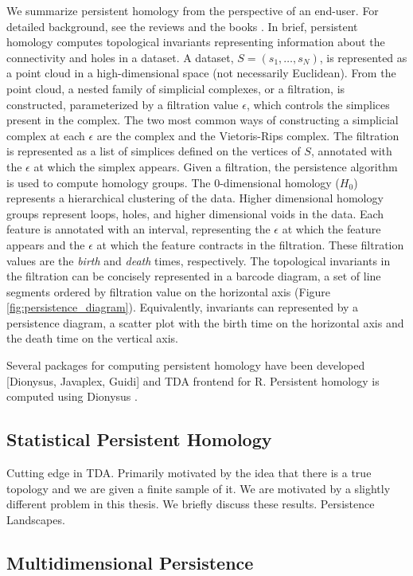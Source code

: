 We summarize persistent homology from the perspective of an end-user.
For detailed background, see the reviews \cite{Carlsson:2009a,Ghrist:2008} and the books \cite{Edelsbrunner:2010,Zomorodian:2005b}.
In brief, persistent homology computes topological invariants representing information about the connectivity and holes in a dataset.
A dataset, $S=(s_{1},\ldots,s_{N})$, is represented as a point cloud in a high-dimensional space (not necessarily Euclidean).
From the point cloud, a nested family of simplicial complexes, or a filtration, is constructed, parameterized by a filtration value $\epsilon$, which controls the simplices present in the complex.
The two most common ways of constructing a simplicial complex at each $\epsilon$ are the \Cech complex and the Vietoris-Rips complex.
The filtration is represented as a list of simplices defined on the vertices of $S$, annotated with the $\epsilon$ at which the simplex appears.
Given a filtration, the persistence algorithm is used to compute homology groups.
The $0$-dimensional homology ($H_0$) represents a hierarchical clustering of the data.
Higher dimensional homology groups represent loops, holes, and higher dimensional voids in the data.
Each feature is annotated with an interval, representing the $\epsilon$ at which the feature appears and the $\epsilon$ at which the feature contracts in the filtration.
These filtration values are the \emph{birth} and \emph{death} times, respectively.
The topological invariants in the filtration can be concisely represented in a barcode diagram, a set of line segments ordered by filtration value on the horizontal axis (Figure \ref{fig:persistence_diagram}).
Equivalently, invariants can represented by a persistence diagram, a scatter plot with the birth time on the horizontal axis and the death time on the vertical axis.

Several packages for computing persistent homology have been developed [Dionysus, Javaplex, Guidi] and TDA frontend for R.
Persistent homology is computed using Dionysus \cite{Morozov:2012}.

\subsection{Statistical Persistent Homology}

Cutting edge in TDA.
Primarily motivated by the idea that there is a true topology and we are given a finite sample of it.
We are motivated by a slightly different problem in this thesis.
We briefly discuss these results.
Persistence Landscapes.


\subsection{Multidimensional Persistence}

